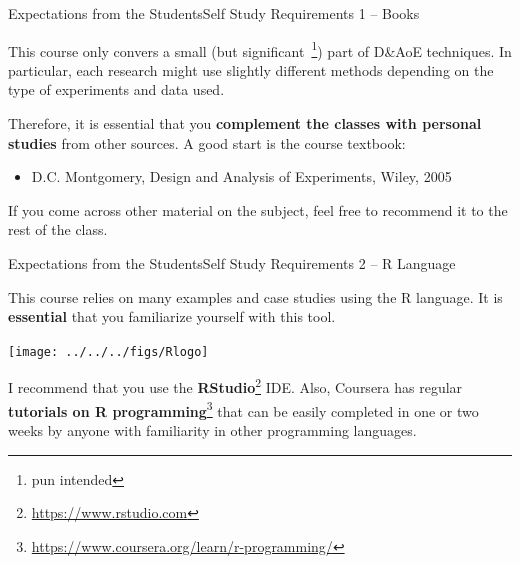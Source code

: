 \documentclass[t]{beamer}
\begin{document}
\begin{ftst}
  {Expectations from the Students}{Self Study Requirements 1 -- Books}

  This course only convers a small (but significant~\footnote{pun
    intended}) part of D\&AoE techniques. In particular, each research
  might use slightly different methods depending on the type of
  experiments and data used.

  \vone

  Therefore, it is essential that you {\bf complement the classes with
    personal studies} from other sources. A good start is the course
  textbook:
  
  \vone

  \begin{itemize}
    \item D.C. Montgomery, Design and Analysis of Experiments, Wiley, 2005
  \end{itemize}

  \vone

  If you come across other material on the subject, feel free to
  recommend it to the rest of the class.
\end{ftst}

\begin{ftst}
  {Expectations from the Students}{Self Study Requirements 2 -- R Language}

  This course relies on many examples and case studies using the R
  language. It is {\bf essential} that you familiarize yourself with
  this tool.

  \vone

  \begin{center}
    \texttt{[image: ../../../figs/Rlogo]}
  \end{center}
  
  \vone
  
  I recommend that you use the
  {\bf RStudio}\footnote{\url{https://www.rstudio.com}} IDE. Also,
  Coursera has regular {\bf tutorials on R
    programming}\footnote{\url{https://www.coursera.org/learn/r-programming/}}
  that can be easily completed in one or two weeks by anyone with
  familiarity in other programming languages.
  
  
\end{ftst}
\end{document}
